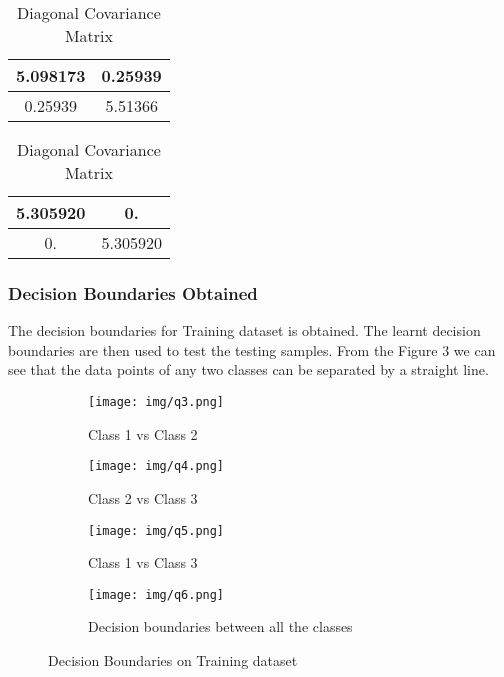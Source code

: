\begin{table}[H]
    \begin{minipage}{0.5\textwidth}
        \centering
        \begin{tabular}{|c|c|}
            \hline
            
            5.098173   & 0.25939   \\
            \hline
            0.25939   & 5.51366  \\
            \hline
        \end{tabular}
        \caption{Average Covariance Matrix}
        \label{tab:Table3}
    \end{minipage}%
    \begin{minipage}{0.5\textwidth}
        \centering
        \begin{tabular}{|c|c|}
            \hline
            
            5.305920   & 0.   \\
            \hline
            0.   & 5.305920   \\
            \hline
        \end{tabular}
    \caption{Diagonal Covariance Matrix}
    \label{tab:Table4}
    \end{minipage}
\end{table}



\subsubsection{Decision Boundaries Obtained}
The decision boundaries for Training dataset is obtained. The learnt decision boundaries are then used to test the testing samples. From the Figure 3 we can see that the data points of any two classes can be separated by a straight
line.
\\
\begin{figure}[!hbt]
    \begin{subfigure}{0.49\textwidth}
        \texttt{[image: img/q3.png]}
        \caption{Class 1 vs Class 2 }
    \end{subfigure}%
    \hfill
    \begin{subfigure}{0.49\textwidth}
        \texttt{[image: img/q4.png]}
        \caption{Class 2 vs Class 3}
    \end{subfigure}
    
    \begin{subfigure}{0.49\textwidth}
        \texttt{[image: img/q5.png]}
        \caption{Class 1 vs Class 3}
    \end{subfigure}%
    \hfill
    \begin{subfigure}{0.49\textwidth}
        \texttt{[image: img/q6.png]}
        \caption{Decision boundaries between all the classes}
    \end{subfigure}
    
    \caption{Decision Boundaries on Training dataset}
    \label{fig:Figure3}

\end{figure}

